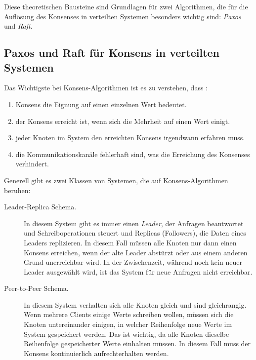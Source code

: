 Diese theoretischen Bausteine sind Grundlagen für zwei Algorithmen, die für die Auflösung des Konsenses in verteilten Systemen besonders wichtig sind: \textit{Paxos} und \textit{Raft}.

\subsection{Paxos und Raft für Konsens in verteilten Systemen}

Das Wichtigste bei Konsens-Algorithmen ist es zu verstehen, dass \cite{Saber03consensusproblems}:

\begin{enumerate}
	\item Konsens die Eignung auf einen einzelnen Wert bedeutet.
	
	\item der Konsens erreicht ist, wenn sich die Mehrheit auf einen Wert einigt.
	
	\item jeder Knoten im System den erreichten Konsens irgendwann erfahren muss.
	
	\item die Kommunikationskanäle fehlerhaft sind, was die Erreichung des Konsenses verhindert.
\end{enumerate}

Generell gibt es zwei Klassen von Systemen, die auf Konsens-Algorithmen beruhen:

\begin{description} 
	\item[Leader-Replica Schema.] In diesem System gibt es immer einen \textit{Leader}, der Anfragen beantwortet und Schreiboperationen steuert und Replicas (Followers), die Daten eines Leaders replizieren. In diesem Fall müssen alle Knoten nur dann einen Konsens erreichen, wenn der alte Leader abstürzt oder aus einem anderen Grund unerreichbar wird. In der Zwischenzeit, während noch kein neuer Leader ausgewählt wird, ist das System für neue Anfragen nicht erreichbar.
	
	\item[Peer-to-Peer Schema.] In diesem System verhalten sich alle Knoten gleich und sind gleichrangig. Wenn mehrere Clients einige Werte schreiben wollen, müssen sich die Knoten untereinander einigen, in welcher Reihenfolge neue Werte im System gespeichert werden. Das ist wichtig, da alle Knoten dieselbe Reihenfolge gespeicherter Werte einhalten müssen. In diesem Fall muss der Konsens kontinuierlich aufrechterhalten werden.
\end{description}

